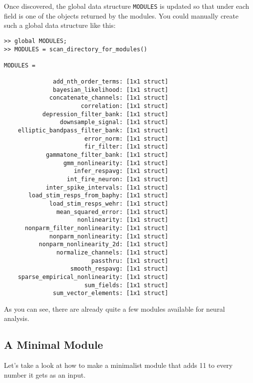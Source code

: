 \documentclass[letterpaper]{report}
\newcommand{\matlab}[1]{\texttt{#1}}
\begin{document}
Once discovered, the global data structure \matlab{MODULES} is updated so that under each field is one of the objects returned by the modules. You could manually create such a global data structure like this:

\begin{verbatim}
>> global MODULES;
>> MODULES = scan_directory_for_modules()

MODULES = 

              add_nth_order_terms: [1x1 struct]
              bayesian_likelihood: [1x1 struct]
             concatenate_channels: [1x1 struct]
                      correlation: [1x1 struct]
           depression_filter_bank: [1x1 struct]
                downsample_signal: [1x1 struct]
    elliptic_bandpass_filter_bank: [1x1 struct]
                       error_norm: [1x1 struct]
                       fir_filter: [1x1 struct]
            gammatone_filter_bank: [1x1 struct]
                 gmm_nonlinearity: [1x1 struct]
                    infer_respavg: [1x1 struct]
                  int_fire_neuron: [1x1 struct]
            inter_spike_intervals: [1x1 struct]
       load_stim_resps_from_baphy: [1x1 struct]
             load_stim_resps_wehr: [1x1 struct]
               mean_squared_error: [1x1 struct]
                     nonlinearity: [1x1 struct]
      nonparm_filter_nonlinearity: [1x1 struct]
             nonparm_nonlinearity: [1x1 struct]
          nonparm_nonlinearity_2d: [1x1 struct]
               normalize_channels: [1x1 struct]
                         passthru: [1x1 struct]
                   smooth_respavg: [1x1 struct]
    sparse_empirical_nonlinearity: [1x1 struct]
                       sum_fields: [1x1 struct]
              sum_vector_elements: [1x1 struct]
\end{verbatim}

As you can see, there are already quite a few modules available for neural analysis. 

\subsection{A Minimal Module}

Let's take a look at how to make a minimalist module that adds 11 to every number it gets as an input. 
\end{document}

